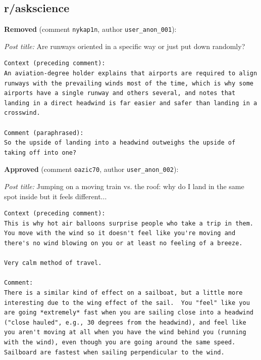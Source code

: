 %

\subsection*{r/askscience}

\noindent\textbf{Removed} (comment \texttt{nykap1n}, author \texttt{user\_anon\_001}):

\noindent\emph{Post title:} Are runways oriented in a specific way or just put down randomly?

\begin{lstlisting}
Context (preceding comment):
An aviation-degree holder explains that airports are required to align runways with the prevailing winds most of the time, which is why some airports have a single runway and others several, and notes that landing in a direct headwind is far easier and safer than landing in a crosswind.

Comment (paraphrased):
So the upside of landing into a headwind outweighs the upside of taking off into one?
\end{lstlisting}

\noindent\textbf{Approved} (comment \texttt{oazic70}, author \texttt{user\_anon\_002}):

\noindent\emph{Post title:} Jumping on a moving train vs. the roof: why do I land in the same spot inside but it feels different...

\begin{lstlisting}
Context (preceding comment):
This is why hot air balloons surprise people who take a trip in them. You move with the wind so it doesn't feel like you're moving and there's no wind blowing on you or at least no feeling of a breeze.

Very calm method of travel.

Comment:
There is a similar kind of effect on a sailboat, but a little more interesting due to the wing effect of the sail.  You "feel" like you are going *extremely* fast when you are sailing close into a headwind ("close hauled", e.g., 30 degrees from the headwind), and feel like you aren't moving at all when you have the wind behind you (running with the wind), even though you are going around the same speed.  Sailboard are fastest when sailing perpendicular to the wind.
\end{lstlisting}


